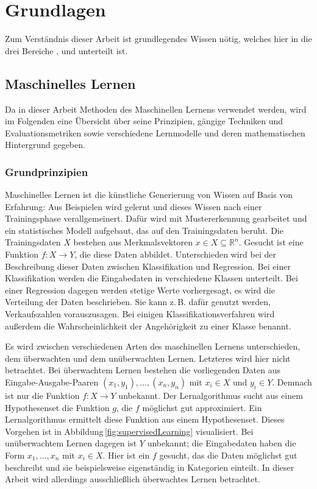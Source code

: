 \chapter{Grundlagen}\label{grundlagen}

Zum Verständnis dieser Arbeit ist grundlegendes Wissen nötig, welches hier in die drei Bereiche ,  und  unterteilt ist.


\section{Maschinelles Lernen}\label{ml-grundlagen}

Da in dieser Arbeit Methoden des Maschinellen Lernens verwendet werden, wird im Folgenden eine Übersicht über seine Prinzipien, gängige Techniken und Evaluationsmetriken sowie verschiedene Lernmodelle und deren mathematischen Hintergrund gegeben.

	\subsection{Grundprinzipien}
	
	Maschinelles Lernen ist die \glqq künstliche\grqq{} Generierung von Wissen auf Basis von Erfahrung: Aus Beispielen wird gelernt und dieses Wissen nach einer Trainingsphase verallgemeinert. Dafür wird mit Mustererkennung gearbeitet und ein statistisches Modell aufgebaut, das auf den Trainingsdaten beruht. Die Trainingsdaten $X$ bestehen aus Merkmalsvektoren $x \in X \subseteq \mathbb{R}^n$. %
	Gesucht ist eine Funktion $f: X \to Y$, die diese Daten abbildet. Unterschieden wird bei der Beschreibung dieser Daten zwischen Klassifikation und Regression. Bei einer Klassifikation werden die Eingabedaten in verschiedene Klassen unterteilt. Bei einer Regression dagegen werden stetige Werte vorhergesagt, es wird die Verteilung der Daten beschrieben. Sie kann z.\,B. dafür genutzt werden, Verkaufszahlen vorauszusagen. Bei einigen Klassifikationsverfahren wird außerdem die Wahrscheinlichkeit der Angehörigkeit zu einer Klasse benannt.
	
	Es wird zwischen verschiedenen Arten des maschinellen Lernens unterschieden, dem überwachten und dem unüberwachten Lernen. Letzteres wird hier nicht betrachtet. Bei überwachtem Lernen bestehen die vorliegenden Daten aus Eingabe-Ausgabe-Paaren $(x_1, y_1), ...,(x_n, y_n) \text{ mit } x_i \in X \text{ und } y_i \in Y$. %
	 Demnach ist nur die Funktion $f: X \to Y$ unbekannt. Der Lernalgorithmus sucht aus einem Hypothesenset die Funktion $g$, die $f$ möglichst gut approximiert. Ein Lernalgorithmus ermittelt diese Funktion aus einem Hypothesenset. Dieses Vorgehen ist in Abbildung\,\ref{fig:supervisedLearning} visualisiert. Bei unüberwachtem Lernen dagegen ist $Y$ unbekannt; die Eingabedaten haben die Form $x_1, ..., x_n \text{ mit } x_i \in X$. Hier ist ein $f$ gesucht, das die Daten möglichst gut beschreibt und sie beispielsweise eigenständig in Kategorien einteilt. In dieser Arbeit wird allerdings ausschließlich überwachtes Lernen betrachtet.
	
